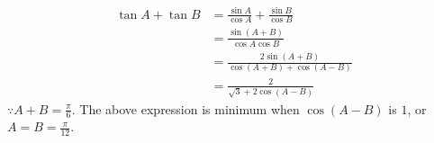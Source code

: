 \begin{align}
\tan A + \tan B &= \frac{\sin A}{\cos A}+\frac{\sin B}{\cos B} \\
	&=\frac{\sin(A+B)}{\cos A \cos B}\\
	&= \frac{2\sin(A+B)}{\cos(A+B)+\cos(A-B)}  \\
	&=\frac{2}{\sqrt{3}+2\cos(A-B)}
\end{align}
$\because A+B = \frac{\pi}{6}$.  The above expression is minimum when 
 $\cos(A-B)$ is $1$, or $A = B = \frac{\pi}{12}$. 
      

